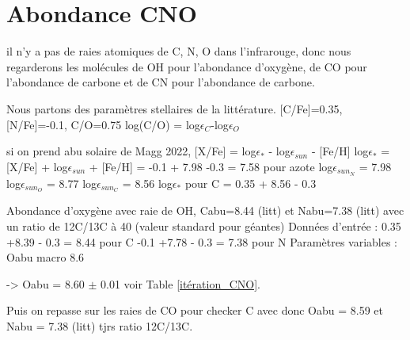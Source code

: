\documentclass{article}
\begin{document}
\section{\sc Abondance CNO}
il n'y a pas de raies atomiques de C, N, O dans l'infrarouge, donc nous regarderons les molécules de OH pour l'abondance d'oxygène, de CO pour l'abondance de carbone et de CN pour l'abondance de carbone. 

Nous partons des paramètres stellaires de la littérature. [C/Fe]=0.35, [N/Fe]=-0.1, C/O=0.75
 log(C/O) = log$\epsilon_C$-log$\epsilon_O$

si on prend abu solaire de Magg 2022, 
[X/Fe] = log$\epsilon_*$ - log$\epsilon_{sun}$ - [Fe/H]
log$\epsilon_*$ = [X/Fe] + log$\epsilon_{sun}$ + [Fe/H]
= -0.1 + 7.98 -0.3 = 7.58 pour azote
log$\epsilon_{sun_N}$ = 7.98
log$\epsilon_{sun_O}$ = 8.77
log$\epsilon_{sun_C}$ = 8.56
log$\epsilon_*$ pour C = 0.35 + 8.56 - 0.3

Abondance d'oxygène avec raie de OH, Cabu=8.44 (litt) et Nabu=7.38 (litt) \cite{grevesse_solar_2007}
avec un ratio de 12C/13C à 40 (valeur standard pour géantes)
Données d'entrée :
0.35 +8.39 - 0.3 = 8.44 pour C
-0.1 +7.78 - 0.3 = 7.38 pour N
Paramètres variables : 
Oabu
macro 8.6 



-> Oabu = 8.60 $\pm$ 0.01 voir Table \ref{itération_CNO}. 


Puis on repasse sur les raies de CO pour checker C avec donc Oabu = 8.59 et Nabu = 7.38 (litt)
tjrs ratio 12C/13C. 
\end{document}
